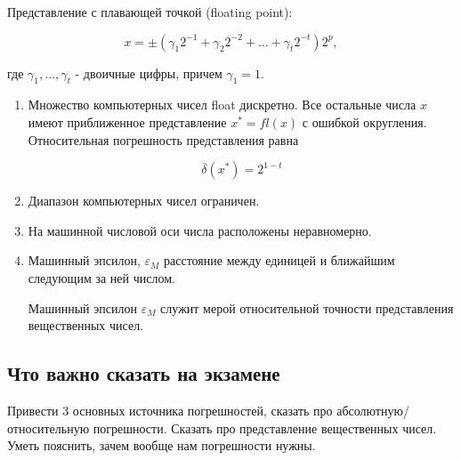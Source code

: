 Представление с плавающей точкой (floating point):

$$ x = \pm (\gamma_1 2^{-1} + \gamma_2 2^{-2} + \dots + \gamma_t 2^{-t}) 2^p, $$

где \(\gamma_1, \dots, \gamma_t\) - двоичные цифры, причем \(\gamma_1 = 1\).

\begin{enumerate}
	\item Множество компьютерных чисел float дискретно. Все остальные числа \( x \) имеют приближенное представление $ x^* = fl(x) $  
	с ошибкой округления. Относительная погрешность представления равна  
	
	$$ 	\overline{\delta}(x^*) = 2^{1-t} $$
	\item Диапазон компьютерных чисел ограничен.
	\item На машинной числовой оси числа расположены неравномерно.
	\item Машинный эпсилон, $\varepsilon_M$ расстояние между единицей и
	ближайшим следующим за ней числом.
	
	Машинный эпсилон $\varepsilon_M$ служит мерой относительной точности
	представления вещественных чисел.
\end{enumerate}

\subsection{Что важно сказать на экзамене}

Привести 3 основных источника погрешностей, сказать про абсолютную/относительную погрешности. Сказать про представление вещественных чисел. Уметь пояснить, зачем вообще нам погрешности нужны.

\newpage